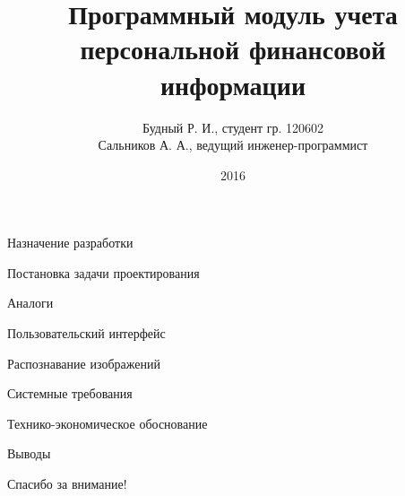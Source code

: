 \documentclass[hyperref={pdftex,unicode}]{beamer}
\title{Программный модуль учета персональной финансовой информации}
\author{%
  Будный Р. И., студент гр. 120602 \\
  Сальников А. А., ведущий инженер-программист
}
\date{2016}
\begin{document}
\begin{frame}
  \maketitle
\end{frame}

\begin{frame}{Назначение разработки}

\end{frame}

\begin{frame}{Постановка задачи проектирования}

\end{frame}

\begin{frame}{Аналоги}

\end{frame}

\begin{frame}{Пользовательский интерфейс}

\end{frame}

\begin{frame}{Распознавание изображений}

\end{frame}

\begin{frame}{Системные требования}

\end{frame}

\begin{frame}{Технико-экономическое обоснование}

\end{frame}

\begin{frame}{Выводы}

\end{frame}

\begin{frame}{Спасибо за внимание!}

\end{frame}
\end{document}
